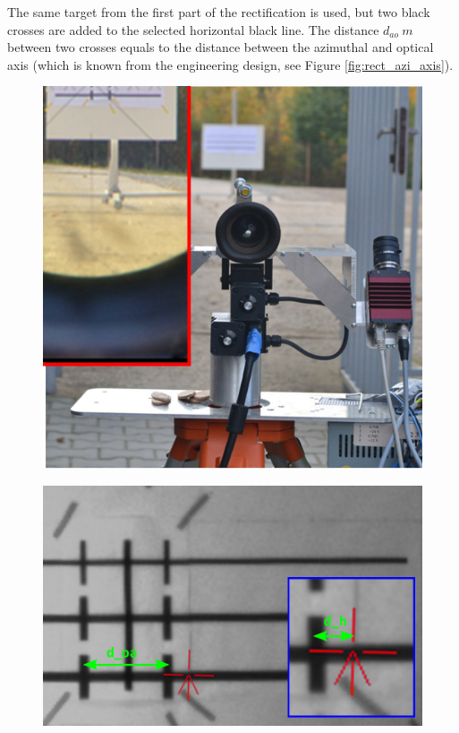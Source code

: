 The same target from the first part of the rectification is used, but two black crosses are added to the selected horizontal black line. The distance $d_{ao}\ m$ between two crosses equals to the distance between the azimuthal and optical axis (which is known from the engineering design, see Figure \ref{fig:rect_azi_axis}). 

\begin{figure}[htb]
	\centering
	\begin{minipage}{.37\textwidth}
		\centering
		\includegraphics[width=.99\linewidth]{fig/rect_telescope.png}
		\label{fig:rect_telescope}
	\end{minipage}
	\hfill
	\begin{minipage}{.59\textwidth}
		\centering
		\includegraphics[width=.99\linewidth]{fig/rect_azi_axis.pdf}

\end{minipage}
\end{figure}
